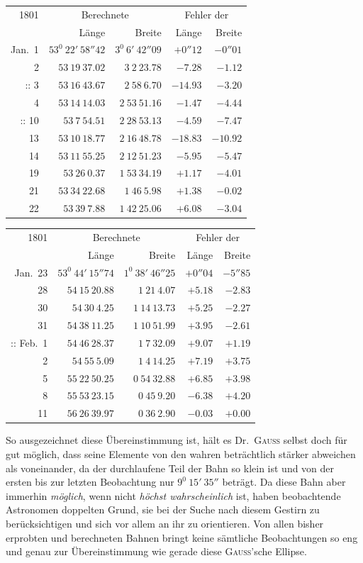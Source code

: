 \begin{center}
{\small\setlength{\tabcolsep}{4pt}
\begin{tabular}{r|r|r|r|r}
1801&\multicolumn{2}{c|}{Berechnete}&\multicolumn{2}{c}{Fehler der}\\
&Länge&Breite&Länge&Breite\\\hline
Jan.\ 1&$53^0\ 22'\ 58''42$&$3^0\ 6'\ 42''09$&$+0''12$&$-0''01$\\
2&$53\ 19\ 37.02$&$3\ 2\ 23.78$&$-7.28$&$-1.12$\\
$\mathord{:}\mathord{:}$ 3&$53\ 16\ 43.67$&$2\ 58\ 6.70$&$-14.93$&$-3.20$\\
4&$53\ 14\ 14.03$&$2\ 53\ 51.16$&$-1.47$&$-4.44$\\
$\mathord{:}\mathord{:}$ 10&$53\ 7\ 54.51$&$2\ 28\ 53.13$&$-4.59$&$-7.47$\\
13&$53\ 10\ 18.77$&$2\ 16\ 48.78$&$-18.83$&$-10.92$\\
14&$53\ 11\ 55.25$&$2\ 12\ 51.23$&$-5.95$&$-5.47$\\
19&$53\ 26\ 0.37$&$1\ 53\ 34.19$&$+1.17$&$-4.01$\\
21&$53\ 34\ 22.68$&$1\ 46\ 5.98$&$+1.38$&$-0.02$\\
22&$53\ 39\ 7.88$&$1\ 42\ 25.06$&$+6.08$&$-3.04$
\end{tabular}
\par\medskip
\begin{tabular}{r|r|r|r|r}
1801&\multicolumn{2}{c|}{Berechnete}&\multicolumn{2}{c}{Fehler der}\\
&Länge&Breite&Länge&Breite\\\hline
Jan.\ 23&$53^0\ 44'\ 15''74$&$1^0\ 38'\ 46''25$&$+0''04$&$-5''85$\\
28&$54\ 15\ 20.88$&$1\ 21\ 4.07$&$+5.18$&$-2.83$\\
30&$54\ 30\ 4.25$&$1\ 14\ 13.73$&$+5.25$&$-2.27$\\
31&$54\ 38\ 11.25$&$1\ 10\ 51.99$&$+3.95$&$-2.61$\\
$\mathord{:}\mathord{:}$ Feb.\ 1&$54\ 46\ 28.37$&$1\ 7\ 32.09$&$+9.07$&$+1.19$\\
2&$54\ 55\ 5.09$&$1\ 4\ 14.25$&$+7.19$&$+3.75$\\
5&$55\ 22\ 50.25$&$0\ 54\ 32.88$&$+6.85$&$+3.98$\\
8&$55\ 53\ 23.15$&$0\ 45\ 9.20$&$-6.38$&$+4.20$\\
11&$56\ 26\ 39.97$&$0\ 36\ 2.90$&$-0.03$&$+0.00$
\end{tabular}}
\end{center}
%
So ausgezeichnet diese Übereinstimmung ist, hält es Dr.\ \textsc{Gauss} selbst doch für gut möglich, dass seine Elemente von den wahren beträchtlich stärker abweichen als voneinander, da der durchlaufene Teil der Bahn so klein ist und von der ersten bis zur letzten Beobachtung nur $9^0\ 15'\ 35''$ beträgt. Da diese Bahn aber immerhin \textit{möglich}, wenn nicht \textit{höchst wahrscheinlich} ist, haben beobachtende Astronomen doppelten Grund, sie bei der Suche nach diesem Gestirn zu berücksichtigen und sich vor allem an ihr zu orientieren. Von allen bisher erprobten und berechneten Bahnen bringt keine sämtliche Beobachtungen so eng und genau zur Übereinstimmung wie gerade diese \textsc{Gauss}'sche Ellipse.

